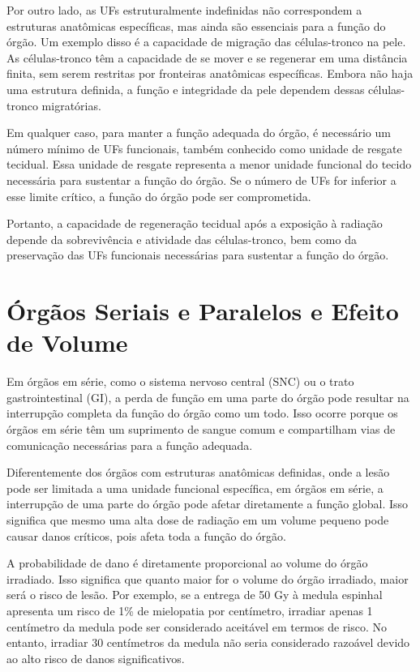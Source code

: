 \documentclass[11pt,a4paper]{article}
\newcounter{exemplo}
\begin{document}
	Por outro lado, as UFs estruturalmente indefinidas não correspondem a estruturas anatômicas específicas, mas ainda são essenciais para a função do órgão. Um exemplo disso é a capacidade de migração das células-tronco na pele. As células-tronco têm a capacidade de se mover e se regenerar em uma distância finita, sem serem restritas por fronteiras anatômicas específicas. Embora não haja uma estrutura definida, a função e integridade da pele dependem dessas células-tronco migratórias.

	Em qualquer caso, para manter a função adequada do órgão, é necessário um número mínimo de UFs funcionais, também conhecido como unidade de resgate tecidual. Essa unidade de resgate representa a menor unidade funcional do tecido necessária para sustentar a função do órgão. Se o número de UFs for inferior a esse limite crítico, a função do órgão pode ser comprometida.

	Portanto, a capacidade de regeneração tecidual após a exposição à radiação depende da sobrevivência e atividade das células-tronco, bem como da preservação das UFs funcionais necessárias para sustentar a função do órgão.

\section{Órgãos Seriais e Paralelos e Efeito de Volume}

	Em órgãos em série, como o sistema nervoso central (SNC) ou o trato gastrointestinal (GI), a perda de função em uma parte do órgão pode resultar na interrupção completa da função do órgão como um todo. Isso ocorre porque os órgãos em série têm um suprimento de sangue comum e compartilham vias de comunicação necessárias para a função adequada.

	Diferentemente dos órgãos com estruturas anatômicas definidas, onde a lesão pode ser limitada a uma unidade funcional específica, em órgãos em série, a interrupção de uma parte do órgão pode afetar diretamente a função global. Isso significa que mesmo uma alta dose de radiação em um volume pequeno pode causar danos críticos, pois afeta toda a função do órgão.

	A probabilidade de dano é diretamente proporcional ao volume do órgão irradiado. Isso significa que quanto maior for o volume do órgão irradiado, maior será o risco de lesão. Por exemplo, se a entrega de 50 Gy à medula espinhal apresenta um risco de 1\% de mielopatia por centímetro, irradiar apenas 1 centímetro da medula pode ser considerado aceitável em termos de risco. No entanto, irradiar 30 centímetros da medula não seria considerado razoável devido ao alto risco de danos significativos.
\end{document}
